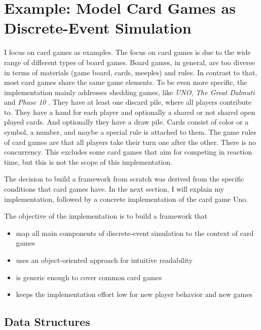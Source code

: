 
\section{Example: Model Card Games as Discrete-Event Simulation}


I focus on card games as examples. The focus on card games is due to the wide range of different types of board games. Board games, in general, are too diverse in terms of materials (game board, cards, meeples) and rules. In contrast to that, most card games share the same game elements. To be even more specific, the implementation mainly addresses shedding games, like \textit{UNO}, \textit{The Great Dalmuti} and \textit{Phase 10} \cite{wiki:sheddinglist}. They have at least one discard pile, where all players contribute to. They have a hand for each player and optionally a shared or not shared open played cards. And optionally they have a draw pile. Cards consist of color or a symbol, a number, and maybe a special rule is attached to them.
The game rules of card games are that all players take their turn one after the other. There is no concurrency. This excludes some card games that aim for competing in reaction time, but this is not the scope of this implementation.

The decision to build a framework from scratch was derived from the specific conditions that card games have.
In the next section, I will explain my implementation, followed by a concrete implementation of the card game Uno.

The objective of the implementation is to build a framework that

\begin{itemize}
\item map all main components of discrete-event simulation to the context of card games
\item uses an object-oriented approach for intuitive readability
\item is generic enough to cover common card games
\item keeps the implementation effort low for new player behavior and new games
\end{itemize}


\subsection{Data Structures}


